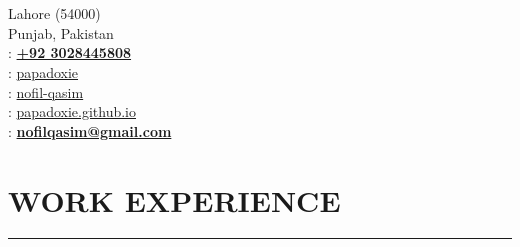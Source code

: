 \documentclass[]{resume}
\begin{document}
%
%

\hfill
\begin{minipage}[t]{0.66\textwidth}

    \vspace{-656pt}

    \hspace*{0pt}\hfill    \\
    \hspace*{0pt}\hfill    \\
    \hspace*{0pt}\hfill Lahore (54000) \\
    \hspace*{0pt}\hfill Punjab, Pakistan \\
    \hspace*{0pt}\hfill {}: \textbf{\href{tel:+923028445808}{+92 3028445808}} \\
    \hspace*{0pt}\hfill {}: \href{https://github.com/papadoxie}{papadoxie}\\
    \hspace*{0pt}\hfill {}: \href{https://linkedin.com/in/nofil-qasim}{nofil-qasim}\\
    \hspace*{0pt}\hfill {}: \href{https://papadoxie.github.io}{papadoxie.github.io}\\
    \hspace*{0pt}\hfill {}: \textbf{\href{mailto:nofilqasim@gmail.com}{nofilqasim@gmail.com}}



    \vspace{4.8pt}

    \section{WORK EXPERIENCE}
    \noindent\rule{12.5cm}{0.4pt}

     
    \noindent


\end{minipage}
\end{document}
